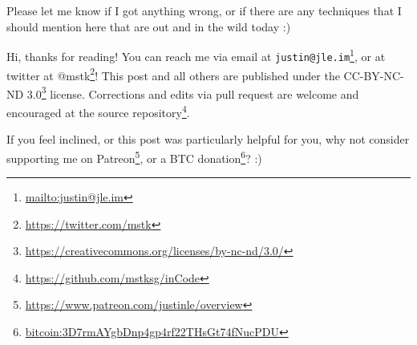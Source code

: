 \documentclass[]{article}
\renewcommand{\href}[2]{#2\footnote{\url{#1}}}
\begin{document}
Please let me know if I got anything wrong, or if there are any techniques that
I should mention here that are out and in the wild today :)

Hi, thanks for reading! You can reach me via email at
\href{mailto:justin@jle.im}{\nolinkurl{justin@jle.im}}, or at twitter at
\href{https://twitter.com/mstk}{@mstk}! This post and all others are published
under the \href{https://creativecommons.org/licenses/by-nc-nd/3.0/}{CC-BY-NC-ND
3.0} license. Corrections and edits via pull request are welcome and encouraged
at \href{https://github.com/mstksg/inCode}{the source repository}.

If you feel inclined, or this post was particularly helpful for you, why not
consider \href{https://www.patreon.com/justinle/overview}{supporting me on
Patreon}, or a \href{bitcoin:3D7rmAYgbDnp4gp4rf22THsGt74fNucPDU}{BTC donation}?
:)
\end{document}
